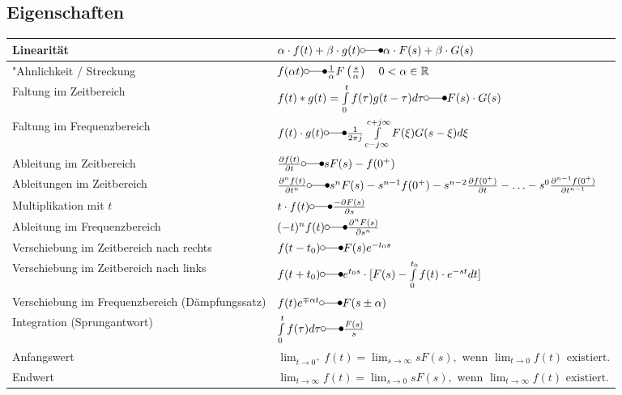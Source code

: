  	\subsection{Eigenschaften}
  		\renewcommand{\arraystretch}{2}
		\begin{tabular}{|l|l|}
        	\hline
        	Linearität & 
 			$\alpha\cdot f(t) + \beta\cdot g(t) \laplace \alpha\cdot F(s) + \beta\cdot
 			G(s)$ \\
 			\hline
 			"Ahnlichkeit / Streckung &
 			$f(\alpha t) \laplace \frac{1}{\alpha}F \left (\frac{s}{\alpha} \right ) \quad 0
 			<\alpha \in\mathbb{R}$ \\
 			\hline
 			Faltung im Zeitbereich &
 			$f(t) \ast g(t) = \int\limits_{0}^{t} f(\tau)g(t-\tau)d\tau \laplace F(s)
 			\cdot G(s)$\\
 			\hline
 			Faltung im Frequenzbereich &
 			$f(t) \cdot g(t) \laplace \frac{1}{2\pi j}\int\limits_{c-j\infty}^{c+j\infty}
 			F(\xi) G(s-\xi)d\xi$ \\
 			\hline
 			Ableitung im Zeitbereich &
 			$\frac{\partial f(t)}{\partial t} \laplace sF(s)
 			-f(0^+)$ \\
 			\hline
 			Ableitungen im Zeitbereich &
 			$\frac{\partial^n f(t)}{\partial t^n} \laplace s^nF(s)
 			-s^{n-1}f(0^+)-s^{n-2}\frac{\partial f(0^+)}{\partial t}-\ldots
 			-s^0\frac{\partial^{n-1} f(0^+)}{\partial t^{n-1}}$ \\
 			\hline
 			Multiplikation mit $t$ &
 			$t\cdot f(t)  \laplace \frac{-\partial F(s)}{\partial s}$ \\
 			\hline
 			Ableitung im Frequenzbereich &
 			$(-t)^n f(t) \laplace  \frac{\partial^n F(s)}{\partial s^n}$ \\
 			\hline
 			Verschiebung im Zeitbereich nach rechts &
 			$f(t - t_0) \laplace F(s)e^{- t_0 s}$ \\
 			\hline
			Verschiebung im Zeitbereich nach links &
			$f(t + t_0) \laplace e^{t_0 s} \cdot [F(s) - \int\limits_0^{t_0} f(t) \cdot e^{-st} dt]$\\
			\hline
 			Verschiebung im Frequenzbereich (Dämpfungssatz) &
 			$f(t)e^{\mp\alpha t} \laplace F(s\pm\alpha)$ \\
 			\hline
 			Integration (Sprungantwort)&
 			$\int\limits_0^t f(\tau)d\tau \laplace \frac{F(s)}{s}$ \\
 			\hline
 			Anfangswert &
 			$\lim_{t\rightarrow 0^+} f(t) = \lim_{s\rightarrow \infty} sF(s),\text{~wenn
 			}  \lim_{t\rightarrow 0} f(t)\text{~existiert}.$ \\
 			\hline
 			Endwert &
 			$\lim_{t\rightarrow \infty} f(t) = \lim_{s\rightarrow 0} sF(s),\text{~wenn
 			}  \lim_{t\rightarrow \infty} f(t)\text{~existiert}.$ \\
 			\hline
       	\end{tabular}
		\renewcommand{\arraystretch}{\arraystretchOriginal}
	
